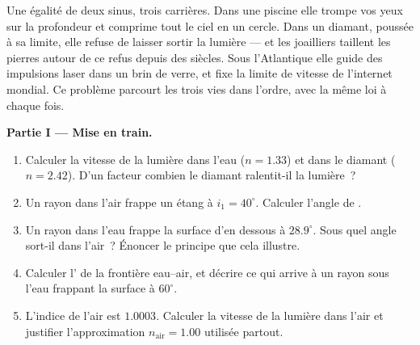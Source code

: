 \begin{problem}
\label{pb:g10:refraction:1}
Une égalité de deux sinus, trois carrières. Dans une piscine elle
trompe vos yeux sur la profondeur et comprime tout le ciel en un
cercle. Dans un diamant, poussée à sa limite, elle refuse de laisser
sortir la lumière --- et les joailliers taillent les pierres autour de
ce refus depuis des siècles. Sous l'Atlantique elle guide des
impulsions laser dans un brin de verre, et fixe la limite de vitesse de
l'internet mondial. Ce problème parcourt les trois vies dans l'ordre,
avec la même loi à chaque fois.

\medskip
\noindent\textbf{Partie I --- Mise en train.}
\begin{enumerate}
  \item Calculer la vitesse de la lumière dans l'eau ($n = 1.33$) et
        dans le diamant ($n = 2.42$). D'un facteur combien le diamant
        ralentit-il la lumière~?
  \item Un rayon dans l'air frappe un étang à $i_1 = 40^\circ$.
        Calculer l'angle de .
  \item Un rayon dans l'eau frappe la surface d'en dessous à
        $28.9^\circ$. Sous quel angle sort-il dans l'air~? Énoncer le
        principe que cela illustre.
  \item Calculer l' de la frontière eau--air, et
        décrire ce qui arrive à un rayon sous l'eau frappant la surface
        à $60^\circ$.
  \item L'indice de l'air est $1.0003$. Calculer la vitesse de la
        lumière dans l'air et justifier l'approximation
        $n_{\text{air}} = 1.00$ utilisée partout.
\end{enumerate}


\end{problem}
